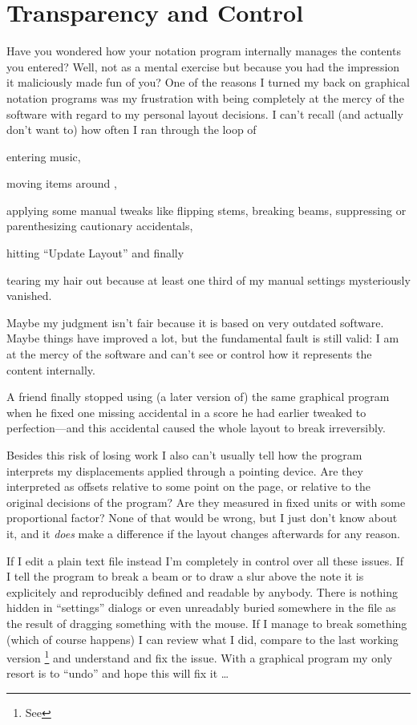\documentclass[../../LilyPond-Tutorials]{subfiles}
\begin{document}
\section{Transparency and Control}
\label{sec:pt_transparency-and-control}
Have you wondered how your notation program internally manages the contents you entered?
Well, not as a mental exercise but because you had the impression it maliciously made fun of you?
One of the reasons I turned my back on graphical notation programs was my frustration with being completely at the mercy of the software with regard to my personal layout decisions.
I can't recall (and actually don't want to) how often I ran through the loop of
\begin{inparaenum}[1.)]
\item entering music,
\item moving items around ,
\item applying some manual tweaks like flipping stems, breaking beams, suppressing or parenthesizing cautionary accidentals,
\item hitting “Update Layout” and finally
\item tearing my hair out because at least one third of my manual settings mysteriously vanished.
\end{inparaenum}

Maybe my judgment isn't fair because it is based on very outdated software.
Maybe things have improved a lot, but the fundamental fault is still valid: 
I am at the mercy of the software and can't see or control how it represents the content internally.

A friend finally stopped using (a later version of) the same graphical program when he fixed one missing accidental in a score he had earlier tweaked to perfection---and this accidental caused the whole layout to break irreversibly.

Besides this risk of losing work I also can't usually tell how the program interprets my displacements applied through a pointing device.
Are they interpreted as offsets relative to some point on the page, or relative to the original decisions of the program?
Are they measured in fixed units or with some proportional factor?
None of that would be wrong, but I just don't know about it, and it \emph{does} make a difference if the layout changes afterwards for any reason.

\medskip
{}

\medskip
If I edit a plain text file instead I'm completely in control over all these issues.
If I tell the program to break a beam or to draw a slur above the note it is explicitely and reproducibly defined and readable by anybody.
There is nothing hidden in “settings” dialogs or even unreadably buried somewhere in the file as the result of dragging something with the mouse.
If I manage to break something (which of course happens) I can review what I did, compare to the last working version%
\footnote{See }
and understand and fix the issue.
With a graphical program my only resort is to “undo” and hope this will fix it \dots
\end{document}

